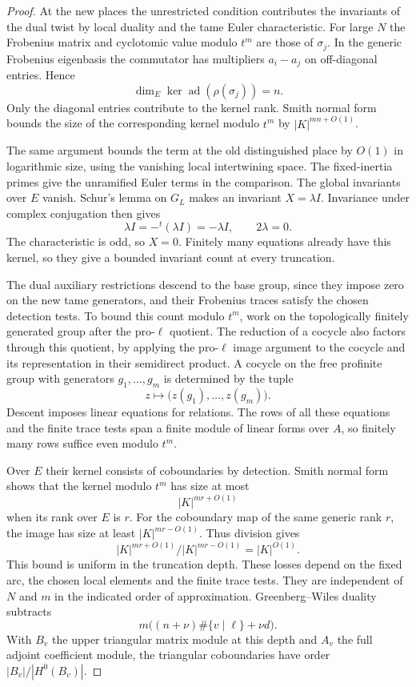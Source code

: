 \begin{proof}
At the new places the unrestricted condition contributes
the invariants of the dual twist by local duality and
the tame Euler characteristic. For large \(N\) the
Frobenius matrix and cyclotomic value modulo \(t^m\)
are those of \(\sigma_j\). In the generic Frobenius eigenbasis the commutator has
multipliers \(a_i-a_j\) on off-diagonal entries. Hence
\[
     \dim_E\ker\operatorname{ad}(\rho(\sigma_j))=n.
\]
Only the diagonal entries contribute to the kernel rank. Smith normal form bounds the
size of the corresponding kernel modulo \(t^m\) by
\(|K|^{mn+O(1)}\).

The same argument bounds the term at
the old distinguished place by \(O(1)\) in logarithmic
size, using the vanishing local intertwining space.
The fixed-inertia primes give the unramified Euler
terms in the comparison. The global invariants
over \(E\) vanish. Schur's lemma on \(G_L\) makes an invariant \(X=\lambda I\). Invariance under complex conjugation then gives
\[
 \lambda I=-{}^t(\lambda I)=-\lambda I,\qquad 2\lambda=0 .
\]
The characteristic is odd, so \(X=0\). Finitely
many equations already have this kernel, so they
give a bounded invariant count at every truncation.

The dual auxiliary restrictions descend to the base
group, since they impose zero on the new tame generators,
and their Frobenius traces satisfy the chosen detection
tests. To bound this count modulo \(t^m\), work on the
topologically finitely generated group after the
pro-\(\ell\) quotient. The reduction of a cocycle also
factors through this quotient, by applying the
pro-\(\ell\) image argument to the cocycle and its
representation in their semidirect product.
A cocycle on the free profinite group with generators \(g_1,\ldots,g_m\) is determined by the tuple
\[
 z\longmapsto\bigl(z(g_1),\ldots,z(g_m)\bigr).
\]
Descent imposes
linear equations for relations. The rows of all these
equations and the finite trace tests span a finite
module of linear forms over \(A\), so finitely many
rows suffice even modulo \(t^m\).

Over \(E\) their
kernel consists of coboundaries by detection. Smith
normal form shows that the kernel modulo \(t^m\)
has size at most
\[
 |K|^{mr+O(1)}
\]
when its rank
over \(E\) is \(r\). For the coboundary map of the same generic rank \(r\), the
image has size at least \(|K|^{mr-O(1)}\). Thus division gives
\[
              |K|^{mr+O(1)}/|K|^{mr-O(1)}=|K|^{O(1)}.
\]
This bound is uniform in the truncation depth. These losses depend
on the fixed arc, the chosen local elements and the
finite trace tests. They are independent of \(N\) and
\(m\) in the indicated order of approximation.
Greenberg--Wiles duality subtracts
\[
 m\bigl((n+\nu)\#\{v\mid\ell\}+\nu d\bigr).
\]
With \(B_v\) the upper triangular matrix module at this
depth and \(A_v\) the full adjoint coefficient module, the
triangular coboundaries have order
\(|B_v|/|H^0(B_v)|\).


\end{proof}

